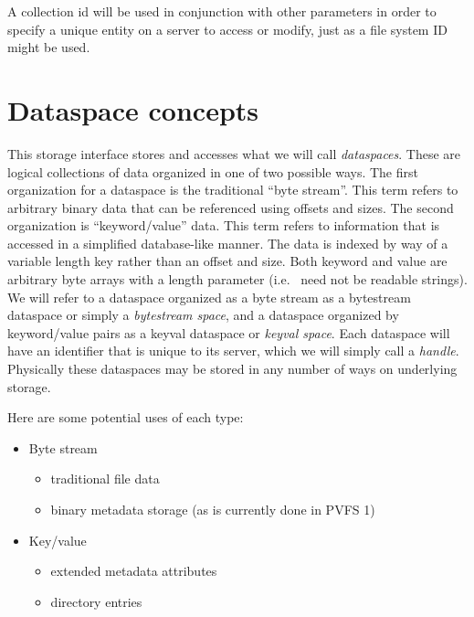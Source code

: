 \documentclass[10pt]{article} %
\begin{document}
A collection id will be used in conjunction with other parameters in
order to specify a unique entity on a server to access or modify, just as a
file system ID might be used.

%
%
\section{Dataspace concepts}

This storage interface stores and accesses what we will call
\emph{dataspaces}.  These are logical collections of data organized in one
of two possible ways.  The first organization for a dataspace is the
traditional ``byte stream''.  This term refers to arbitrary binary data
that can be referenced using offsets and sizes.  The second organization
is ``keyword/value'' data.  This term refers to information that is
accessed in a simplified database-like manner.  The data is indexed by way of a
variable length key rather than an offset and size.  Both keyword and
value are arbitrary byte arrays with a length parameter (i.e.~ need not
be readable strings).  We will refer to a
dataspace organized as a byte stream as a bytestream dataspace or simply
a \emph{bytestream space}, and a dataspace organized by keyword/value
pairs as a keyval dataspace or \emph{keyval space}.
Each dataspace will have an identifier that is unique to its server,
which we will simply call a \emph{handle}.  Physically these dataspaces
may be stored in any number of ways on underlying storage.

Here are some potential uses of each type:
\begin{itemize}
\item Byte stream
\begin{itemize}
\item traditional file data
\item binary metadata storage (as is currently done in PVFS 1)
\end{itemize}
\item Key/value
\begin{itemize}
\item extended metadata attributes 
\item directory entries
\end{itemize}
\end{itemize}

\end{document}
